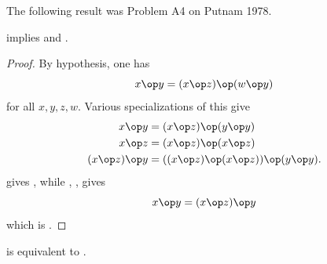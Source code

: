 The following result was Problem A4 on Putnam 1978.

\begin{theorem}[3744 implies 3722, 381]\label{3744_implies_3722_381}\leanok {} implies  and .
\end{theorem}

\begin{proof}\leanok By hypothesis, one has
$$x \op y = (x \op z) \op (w \op y)
  $$
for all $x,y,z,w$.  Various specializations of this give
\begin{align}
 x \op y &= (x \op z) \op (y \op y) \label{381-1} \\
 x \op z &= (x \op z) \op (x \op z) \label{381-2} \\
(x \op z) \op y &= ((x \op z) \op (x \op z)) \op (y \op y) \label{381-3}.
\end{align}
 gives , while , ,  gives
$$ x \op y = (x\op z) \op y$$
which is .
\end{proof}

\begin{theorem}[1689 is equivalent to 2]\label{1689_equiv_2}\leanok {} is equivalent to .
\end{theorem}


